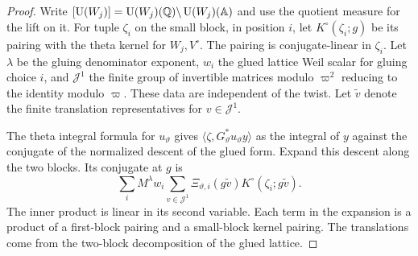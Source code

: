 \begin{proof}
Write $[\operatorname{U}(W_j)]=\operatorname{U}(W_j)(\mathbb Q)\backslash \operatorname{U}(W_j)(\mathbb A)$ and use the quotient measure for the lift on it. For tuple $\zeta_i$ on the small block, in position $i$, let $K^\circ(\zeta_i;g)$ be its pairing with the theta kernel for $W_j,V^\circ$. The pairing is conjugate-linear in $\zeta_i$. Let $\lambda$ be the gluing denominator exponent, $w_i$ the glued lattice Weil scalar for gluing choice $i$, and $\mathcal J^1$ the finite group of invertible matrices modulo $\varpi^2$ reducing to the identity modulo $\varpi$. These data are independent of the twist. Let $\widetilde v$ denote the finite translation representatives for $v\in\mathcal J^1$.

The theta integral formula for $u_\vartheta$ gives $\langle\zeta,G_\vartheta^*u_\vartheta y\rangle$ as the integral of $y$ against the conjugate of the normalized descent of the glued form. Expand this descent along the two blocks. Its conjugate at $g$ is
\[
 \sum_i M^\lambda w_i\sum_{v\in\mathcal J^1}
 \Xi_{\vartheta,i}(g\widetilde v)
 K^\circ(\zeta_i;g\widetilde v).
\]
The inner product is linear in its second variable. Each term in the expansion is a product of a first-block pairing and a small-block kernel pairing. The translations come from the two-block decomposition of the glued lattice.


\end{proof}

